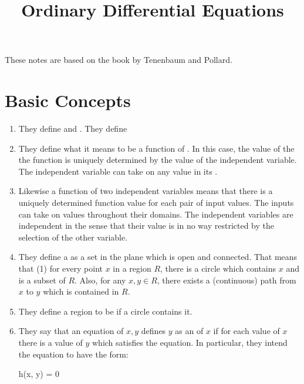 \documentclass[11pt, oneside]{amsart}
\begin{document}
\title{Ordinary Differential Equations}
\maketitle

These notes are based on the book by Tenenbaum and Pollard.

\section{Basic Concepts}

\begin{enumerate}
  \item They define  and . They define

  \item They define what it means to be a function of . In this case, the value of the the function is
  uniquely determined by the value of the independent variable. The
  independent variable can take on any value in its .

  \item Likewise a function of two independent variables means that
  there is a uniquely determined function value for each pair of input
  values. The inputs can take on values throughout their domains. The
  independent variables are independent in the sense that their value is
  in no way restricted by the selection of the other variable.

  \item They define a  as a set in the plane which is
  open and connected. That means that (1) for every point $x$ in a
  region $R$, there is a circle which contains $x$ and is a subset of
  $R$. Also, for any $x, y \in R$, there exists a (continuous) path from
  $x$ to $y$ which is contained in $R$.

  \item They define a region to be  if a circle contains
  it.

  \item They say that an equation of $x, y$ defines $y$ as an
   of $x$ if for each value of $x$ there is a
  value of $y$ which satisfies the equation. In particular, they intend
  the equation to have the form:

  \begin{nedqn}
    h(x, y) = 0
  \end{nedqn}


\end{enumerate}
\end{document}
